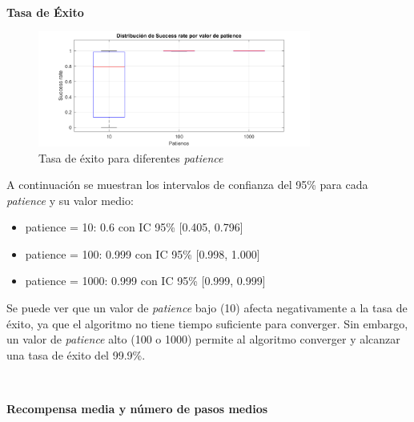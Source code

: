 \

\textbf{Tasa de Éxito}

\begin{figure}[H]
    \centering
    \includegraphics[width=0.8\textwidth]{../../experiments/directEstimation/experiment-3/results/success.png}
    \caption{Tasa de éxito para diferentes \textit{patience}}
    \label{fig:directEstimation3-success}
\end{figure}

A continuación se muestran los intervalos de confianza del 95\% para cada \textit{patience} y su valor medio:
\begin{itemize}
    \item patience = 10: 0.6 con IC 95\% [0.405,  0.796]
    \item patience = 100: 0.999 con IC 95\% [0.998,  1.000]
    \item patience = 1000: 0.999 con IC 95\% [0.999,  0.999]
\end{itemize}

Se puede ver que un valor de \textit{patience} bajo (10) afecta negativamente a la tasa de éxito, ya que el algoritmo no tiene tiempo suficiente para converger. Sin embargo, un valor de \textit{patience} alto (100 o 1000) permite al algoritmo converger y alcanzar una tasa de éxito del 99.9\%.

\

\textbf{Recompensa media y número de pasos medios}

